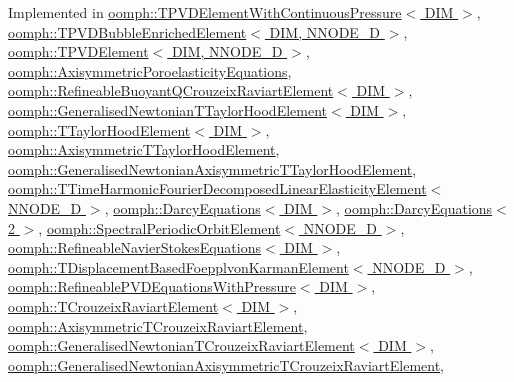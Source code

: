 Implemented in \hyperlink{classoomph_1_1TPVDElementWithContinuousPressure_a58c787ae0839874b13611b75c37863f7}{oomph\+::\+T\+P\+V\+D\+Element\+With\+Continuous\+Pressure$<$ D\+I\+M $>$}, \hyperlink{classoomph_1_1TPVDBubbleEnrichedElement_a5ac20ef9354f134de8b1ec8be4b0f6c4}{oomph\+::\+T\+P\+V\+D\+Bubble\+Enriched\+Element$<$ D\+I\+M, N\+N\+O\+D\+E\+\_\+D $>$}, \hyperlink{classoomph_1_1TPVDElement_a2cae6a6faf4fd3f7555f672fad077061}{oomph\+::\+T\+P\+V\+D\+Element$<$ D\+I\+M, N\+N\+O\+D\+E\+\_\+D $>$}, \hyperlink{classoomph_1_1AxisymmetricPoroelasticityEquations_a209d41a661a1ba1d79d592c8bdef199c}{oomph\+::\+Axisymmetric\+Poroelasticity\+Equations}, \hyperlink{classoomph_1_1RefineableBuoyantQCrouzeixRaviartElement_a630b9aa6c5cf924d32996e89ed230175}{oomph\+::\+Refineable\+Buoyant\+Q\+Crouzeix\+Raviart\+Element$<$ D\+I\+M $>$}, \hyperlink{classoomph_1_1GeneralisedNewtonianTTaylorHoodElement_af391b30468903ccd73ab58cbb3fff7c1}{oomph\+::\+Generalised\+Newtonian\+T\+Taylor\+Hood\+Element$<$ D\+I\+M $>$}, \hyperlink{classoomph_1_1TTaylorHoodElement_a17f2b01ed0325674c23b272ce217e66a}{oomph\+::\+T\+Taylor\+Hood\+Element$<$ D\+I\+M $>$}, \hyperlink{classoomph_1_1AxisymmetricTTaylorHoodElement_ae84ae5860bbfdd54a5f8224f3b0caf46}{oomph\+::\+Axisymmetric\+T\+Taylor\+Hood\+Element}, \hyperlink{classoomph_1_1GeneralisedNewtonianAxisymmetricTTaylorHoodElement_ad607e2e88bfcab444870e8d6b4e4b08a}{oomph\+::\+Generalised\+Newtonian\+Axisymmetric\+T\+Taylor\+Hood\+Element}, \hyperlink{classoomph_1_1TTimeHarmonicFourierDecomposedLinearElasticityElement_ab2806da6c0c8f1f0e40d678ea1de528c}{oomph\+::\+T\+Time\+Harmonic\+Fourier\+Decomposed\+Linear\+Elasticity\+Element$<$ N\+N\+O\+D\+E\+\_\+D $>$}, \hyperlink{classoomph_1_1DarcyEquations_a8315f65f0b04934eea304e60725a7268}{oomph\+::\+Darcy\+Equations$<$ D\+I\+M $>$}, \hyperlink{classoomph_1_1DarcyEquations_a8315f65f0b04934eea304e60725a7268}{oomph\+::\+Darcy\+Equations$<$ 2 $>$}, \hyperlink{classoomph_1_1SpectralPeriodicOrbitElement_a625465ff6702c623efd252d758832445}{oomph\+::\+Spectral\+Periodic\+Orbit\+Element$<$ N\+N\+O\+D\+E\+\_\+D $>$}, \hyperlink{classoomph_1_1RefineableNavierStokesEquations_a7eb93c82d587b3b3c3782e3dc0d0874f}{oomph\+::\+Refineable\+Navier\+Stokes\+Equations$<$ D\+I\+M $>$}, \hyperlink{classoomph_1_1TDisplacementBasedFoepplvonKarmanElement_a19b93ec7635583382906d2911996ddfd}{oomph\+::\+T\+Displacement\+Based\+Foepplvon\+Karman\+Element$<$ N\+N\+O\+D\+E\+\_\+D $>$}, \hyperlink{classoomph_1_1RefineablePVDEquationsWithPressure_a1d386c66a1d4124ba63d344bdc6a2bd2}{oomph\+::\+Refineable\+P\+V\+D\+Equations\+With\+Pressure$<$ D\+I\+M $>$}, \hyperlink{classoomph_1_1TCrouzeixRaviartElement_af770b1f3d012a9b470375d7d98f3407b}{oomph\+::\+T\+Crouzeix\+Raviart\+Element$<$ D\+I\+M $>$}, \hyperlink{classoomph_1_1AxisymmetricTCrouzeixRaviartElement_a4f82cf46d5bea507f5dc71112d9c8781}{oomph\+::\+Axisymmetric\+T\+Crouzeix\+Raviart\+Element}, \hyperlink{classoomph_1_1GeneralisedNewtonianTCrouzeixRaviartElement_a436beb40886487adb54a70d4ce24ac2f}{oomph\+::\+Generalised\+Newtonian\+T\+Crouzeix\+Raviart\+Element$<$ D\+I\+M $>$}, \hyperlink{classoomph_1_1GeneralisedNewtonianAxisymmetricTCrouzeixRaviartElement_a2e704b1a8816bbf86dba405aae9327f1}{oomph\+::\+Generalised\+Newtonian\+Axisymmetric\+T\+Crouzeix\+Raviart\+Element}, 